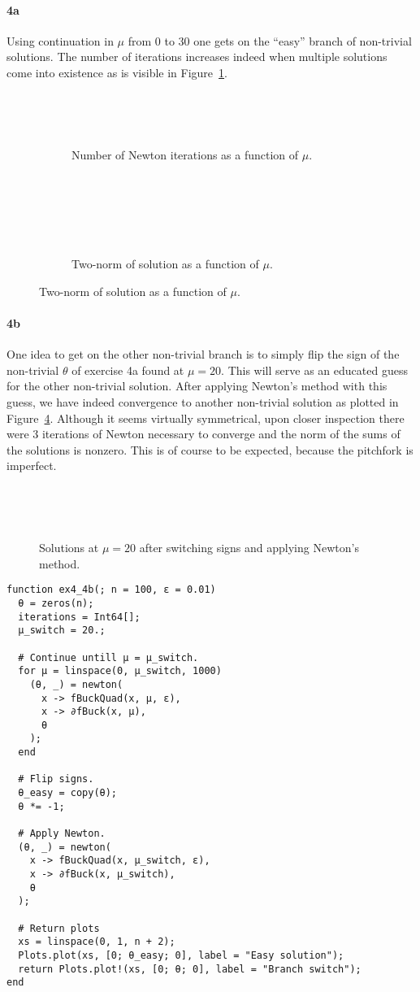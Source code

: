 \documentclass[a4paper]{article}
\begin{document}
  \paragraph{4a} Using continuation in $\mu$ from $0$ to $30$ one gets on the ``easy'' branch of non-trivial solutions. The number of iterations increases indeed when multiple solutions come into existence as is visible in Figure~\ref{fig:newton_iters_4a}.

  \begin{figure}[h]
    \begin{subfigure}[t]{0.5\textwidth}
      ~
      \caption{Number of Newton iterations as a function of $\mu.$}~
      \label{fig:newton_iters_4a}
    \end{subfigure}~
    \begin{subfigure}[t]{0.5\textwidth}
      ~
      \caption{Two-norm of solution as a function of $\mu.$}~
      \label{fig:newton_iters_4a_two_norm}
    \end{subfigure}
  \end{figure}

  \newpage
  \paragraph{4b} One idea to get on the other non-trivial branch is to simply flip the sign of the non-trivial $\theta$ of exercise 4a found at $\mu = 20.$ This will serve as an educated guess for the other non-trivial solution. After applying Newton's method with this guess, we have indeed convergence to another non-trivial solution as plotted in Figure~\ref{fig:ex4b}. Although it seems virtually symmetrical, upon closer inspection there were 3 iterations of Newton necessary to converge and the norm of the sums of the solutions is nonzero. This is of course to be expected, because the pitchfork is imperfect.

  \begin{figure}[p]
    ~
    \caption{Solutions at $\mu = 20$ after switching signs and applying Newton's method.}~
    \label{fig:ex4b}~
  \end{figure}

\begin{verbatim}
function ex4_4b(; n = 100, ɛ = 0.01)
  θ = zeros(n);
  iterations = Int64[];
  μ_switch = 20.;

  # Continue untill μ = μ_switch.
  for μ = linspace(0, μ_switch, 1000)
    (θ, _) = newton(
      x -> fBuckQuad(x, μ, ɛ),
      x -> ∂fBuck(x, μ),
      θ
    );
  end

  # Flip signs.
  θ_easy = copy(θ);
  θ *= -1;

  # Apply Newton.
  (θ, _) = newton(
    x -> fBuckQuad(x, μ_switch, ɛ), 
    x -> ∂fBuck(x, μ_switch),
    θ
  );

  # Return plots
  xs = linspace(0, 1, n + 2);
  Plots.plot(xs, [0; θ_easy; 0], label = "Easy solution");
  return Plots.plot!(xs, [0; θ; 0], label = "Branch switch");
end
\end{verbatim}
\end{document}

